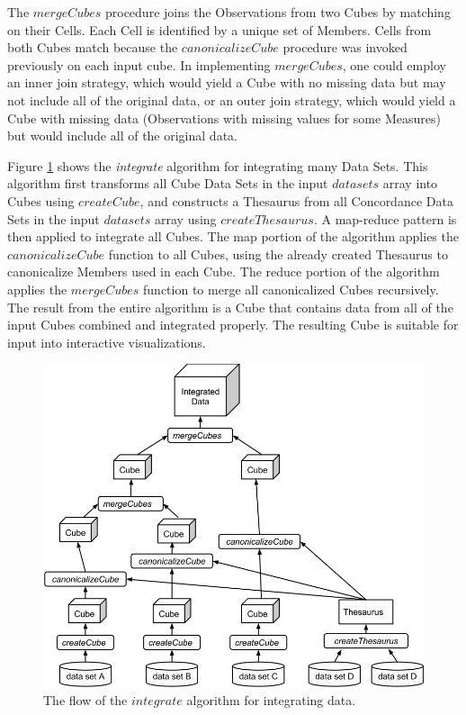 The $mergeCubes$ procedure joins the Observations from two Cubes by matching on their Cells. Each Cell is identified by a unique set of Members. Cells from both Cubes match because the $canonicalizeCube$ procedure was invoked previously on each input cube. In implementing $mergeCubes$, one could employ an inner join strategy, which would yield a Cube with no missing data but may not include all of the original data, or an outer join strategy, which would yield a Cube with missing data (Observations with missing values for some Measures) but would include all of the original data.

Figure \ref{fig:integration} shows the \emph{integrate} algorithm for integrating many Data Sets. This algorithm first transforms all Cube Data Sets in the input $datasets$ array into Cubes using $createCube$, and constructs a Thesaurus from all Concordance Data Sets in the input $datasets$ array using $createThesaurus$. A map-reduce pattern is then applied to integrate all Cubes. The map portion of the algorithm applies the $canonicalizeCube$ function to all Cubes, using the already created Thesaurus to canonicalize Members used in each Cube. The reduce portion of the algorithm applies the $mergeCubes$ function to merge all canonicalized Cubes recursively. The result from the entire algorithm is a Cube that contains data from all of the input Cubes combined and integrated properly. The resulting Cube is suitable for input into interactive visualizations.

\begin{figure}
  \centering
  \includegraphics[width=\figureWidth]{figs/integration.png}
  \caption [UDC Data Integration Algorithm]{The flow of the $integrate$ algorithm for integrating data.}
  \label{fig:integration}
\end{figure}

